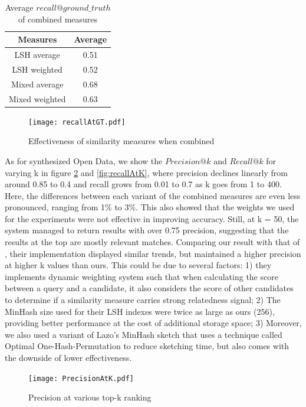 \begin{table}[ht]
    \centering
    \begin{tabular}{|c|c|}
        \hline
        Measures  & Average \\
        \hline
        LSH average & 0.51 \\
        LSH weighted & 0.52 \\
        Mixed average & 0.68 \\
        Mixed weighted & 0.63 \\
        \hline
    \end{tabular}
    \caption{Average $recall@ground\_truth$ of combined measures}
    \label{tab:averageRecallCommbineMeasure}
\end{table}

\begin{figure}[ht]
    \centering
    \texttt{[image: recallAtGT.pdf]}
    \caption{Effectiveness of similarity measures when combined}
    \label{fig:recallAtGT}
\end{figure}

As for synthesized Open Data, we show the $Precision@k$ and $Recall@k$ for varying k in figure \ref{fig:precisionAtK} and \ref{fig:recallAtK}, where precision declines linearly from around 0.85 to 0.4 and recall grows from 0.01 to 0.7 as k goes from 1 to 400. Here, the differences between each variant of the combined measures are even less pronounced, ranging from 1\% to 3\%. This also showed that the weights we used for the experiments were not effective in improving accuracy. Still, at k = 50, the system managed to return results with over 0.75 precision, suggesting that the results at the top are mostly relevant matches. Comparing our result with that of \cite{d3l}, their implementation displayed similar trends, but maintained a higher precision at higher k values than ours. This could be due to several factors: 1) they implements dynamic weighting system such that when calculating the score between a query and a candidate, it also considers the score of other candidates to determine if a similarity measure carries strong relatedness signal; 2) The MinHash size used for their LSH indexes were twice as large as ours (256), providing better performance at the cost of additional storage space; 3) Moreover, we also used a variant of Lazo's MinHash sketch that uses a technique called Optimal One-Hash-Permutation \cite{ooph} to reduce sketching time, but also comes with the downside of lower effectiveness.

\begin{figure}[ht]
    \centering
    \texttt{[image: PrecisionAtK.pdf]}
    \caption{Precision at various top-k ranking}
    \label{fig:precisionAtK}
\end{figure}

